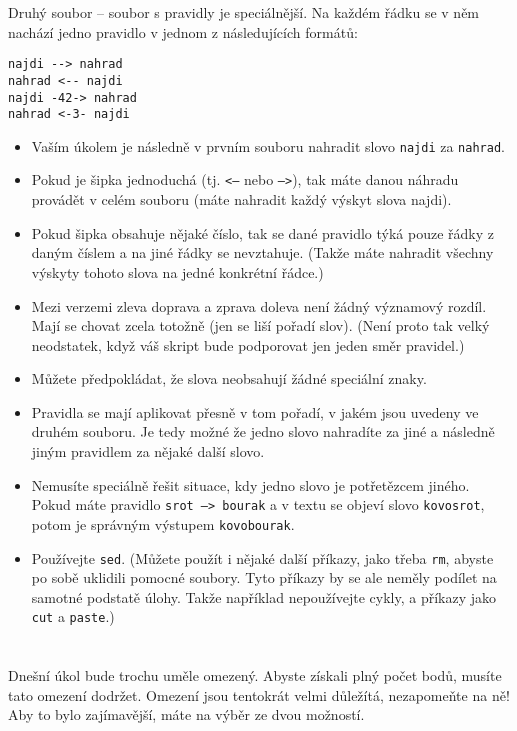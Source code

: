 \documentclass{scrartcl}
\begin{document}
        Druhý soubor -- soubor s pravidly je speciálnější. Na každém řádku se v něm nachází jedno pravidlo v jednom z následujících formátů:

        \begin{verbatim}
najdi --> nahrad
nahrad <-- najdi
najdi -42-> nahrad
nahrad <-3- najdi
        \end{verbatim}

        \begin{itemize}
                \item Vaším úkolem je následně v prvním souboru nahradit slovo \texttt{najdi} za \texttt{nahrad}. 
                \item Pokud je šipka jednoduchá (tj. \texttt{<--} nebo \texttt{-->}), tak máte danou náhradu provádět v celém souboru (máte nahradit každý výskyt slova najdi).
                \item Pokud šipka obsahuje nějaké číslo, tak se dané pravidlo týká pouze řádky z daným číslem a na jiné řádky se nevztahuje. (Takže máte nahradit všechny výskyty tohoto slova na jedné konkrétní řádce.) 
                \item Mezi verzemi zleva doprava a zprava doleva není žádný významový rozdíl. Mají se chovat zcela totožně (jen se liší pořadí slov). (Není proto tak velký neodstatek, když váš skript bude podporovat jen jeden směr pravidel.) 
                \item Můžete předpokládat, že slova neobsahují žádné speciální znaky. 
                \item Pravidla se mají aplikovat přesně v tom pořadí, v jakém jsou uvedeny ve druhém souboru. Je tedy možné že jedno slovo nahradíte za jiné a následně jiným pravidlem za nějaké další slovo. 
                \item Nemusíte speciálně řešit situace, kdy jedno slovo je potřetězcem jiného. Pokud máte pravidlo \texttt{srot --> bourak} a v textu se objeví slovo \texttt{kovosrot}, potom je správným výstupem \texttt{kovobourak}.
                \item Používejte \texttt{sed}. (Můžete použít i nějaké další příkazy, jako třeba \texttt{rm}, abyste po sobě uklidili pomocné soubory. Tyto příkazy by se ale neměly podílet na samotné podstatě úlohy. Takže například nepoužívejte cykly, a příkazy jako \texttt{cut} a \texttt{paste}.)
        \end{itemize}

        \section{}
        Dnešní úkol bude trochu uměle omezený. Abyste získali plný počet bodů, musíte tato omezení dodržet. Omezení jsou tentokrát velmi důležítá, nezapomeňte na ně! Aby to bylo zajímavější, máte na výběr ze dvou možností. \\
\end{document}
